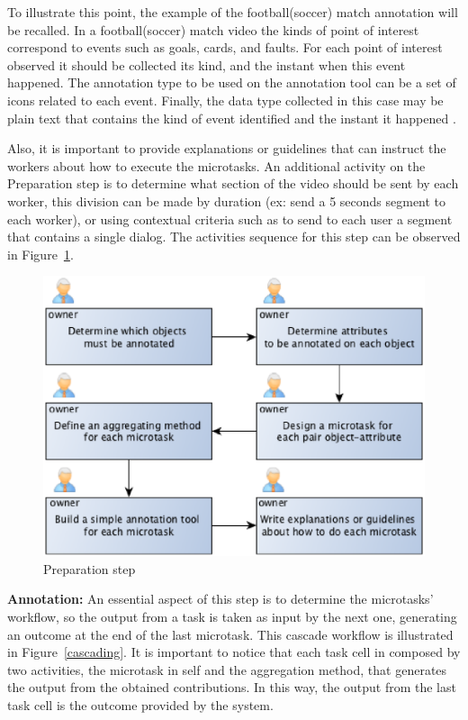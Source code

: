 To illustrate this point, the example of the football(soccer) match annotation will be recalled. In a football(soccer) match video the kinds of point of interest correspond to events such as goals, cards, and faults. For each point of interest observed it should be collected its kind, and the instant when this event happened. The annotation type to be used on the annotation tool can be a set of icons related to each event. Finally, the data type collected in this case may be plain text that contains the kind of event identified and the instant it happened \cite{santos2007estrategia}.

Also, it is important to provide explanations or guidelines that can instruct the workers about how to execute the microtasks. An additional activity on the Preparation step is to determine what section of the video should be sent by each worker, this division can be made by duration (ex: send a 5 seconds segment to each worker), or using contextual criteria such as to send to each user a segment that contains a single dialog. The activities sequence for this step can be observed in Figure~\ref{preparation}.

\begin{figure}[h]
	\centerline{\includegraphics[scale=0.4] {figure/preparation}}
	\caption{Preparation step}
	\label{preparation}
\end{figure}


\textbf{Annotation:} An essential aspect of this step is to determine the microtasks' workflow, so the output from a task is taken as input by the next one, generating an outcome at the end of the last microtask. This cascade workflow is illustrated in Figure~\ref{cascading}. It is important to notice that each task cell in composed by two activities, the microtask in self and the aggregation method, that generates the output from the obtained contributions. In this way, the output from the last task cell is the outcome provided by the system.

